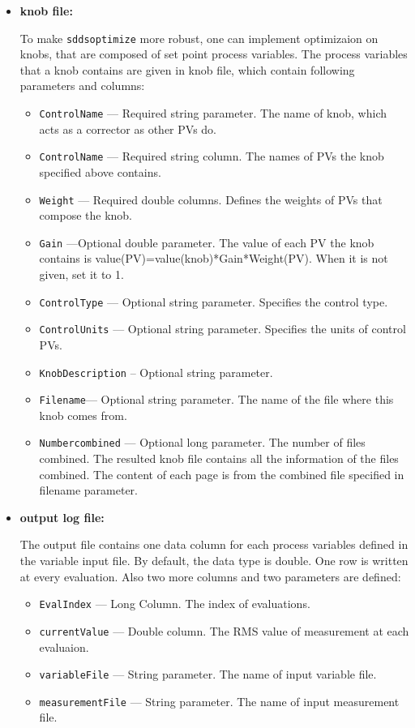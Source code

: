 \begin{itemize}
\begin{itemize}
\begin{itemize}
\end{itemize}

\item {\bf knob file:} \par
To make \verb+sddsoptimize+ more robust, one can implement optimizaion on knobs,
that are composed of set point process variables. The process variables that a knob contains are
given in knob file, which contain following parameters and columns:
\begin{itemize}
        \item {\tt ControlName} --- Required string parameter. The name of knob, which
                acts as a corrector as other PVs do.
        \item {\tt ControlName} --- Required string column. The names of PVs the knob
                specified above contains.
        \item {\tt Weight} --- Required double columns. Defines the weights of PVs that
                compose the knob.
        \item {\tt Gain} ---Optional double parameter. The value of each PV the knob contains
                is value(PV)=value(knob)*Gain*Weight(PV). When it is not given, set it to 1.
        \item {\tt ControlType} --- Optional string parameter. Specifies the control type.
        \item {\tt ControlUnits}  --- Optional string parameter.
                 Specifies the units of control PVs.
        \item {\tt KnobDescription} -- Optional string parameter.
        \item {\tt Filename}--- Optional string parameter. The name of the file where 
                this knob comes from.
        \item {\tt Numbercombined} --- Optional long parameter. The number of files combined.
                The resulted knob file contains all the information of the files combined.
                The content of each page is from the combined file specified in filename parameter.
\end{itemize}

\item {\bf output log file:} \par
The output file contains one data column for each process variables defined in the variable 
input file. By default, the data type is double. One row is written at every evaluation.
Also two more columns and two parameters are defined: 
\begin{itemize}
        \item {\tt EvalIndex} --- Long Column. The index of evaluations.
        \item {\tt currentValue} --- Double column. The RMS value of measurement at each evaluaion.
        \item {\tt variableFile} --- String parameter. The name of input variable file.
        \item {\tt measurementFile} --- String parameter. The name of input measurement file.
\end{itemize}


\end{itemize}
\end{itemize}
